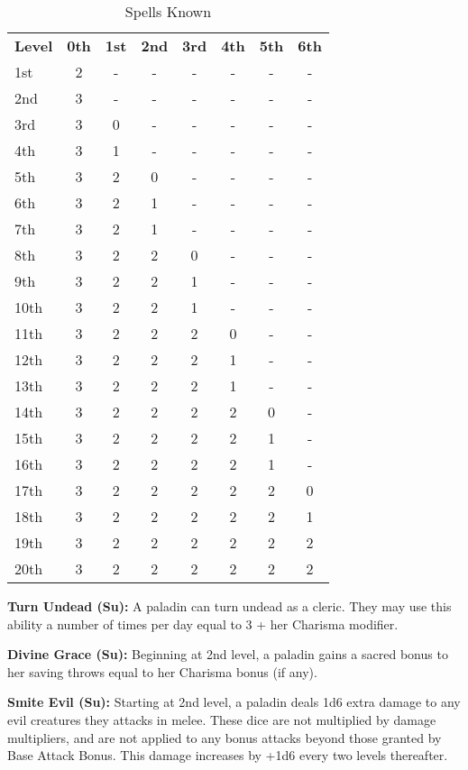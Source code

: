 \setlength{\intextsep}{-5pt}
\begin{wraptable}{O}{8.75cm}
\caption{\currentclassname{} Spells Known}
\begin{tabular}{l*{7}{c}}
\textbf{Level} & \textbf{0th} & \textbf{1st} & \textbf{2nd} & \textbf{3rd} & \textbf{4th} & \textbf{5th} & \textbf{6th} \\
1st & 2 & - & - & - & - & - & -\\
2nd & 3 & - & - & - & - & - & -\\
3rd & 3 & 0 & - & - & - & - & -\\
4th & 3 & 1 & - & - & - & - & -\\
5th & 3 & 2 & 0 & - & - & - & -\\
6th & 3 & 2 & 1 & - & - & - & -\\
7th & 3 & 2 & 1 & - & - & - & -\\
8th & 3 & 2 & 2 & 0 & - & - & -\\
9th & 3 & 2 & 2 & 1 & - & - & -\\
10th & 3 & 2 & 2 & 1 & - & - & -\\
11th & 3 & 2 & 2 & 2 & 0 & - & -\\
12th & 3 & 2 & 2 & 2 & 1 & - & -\\
13th & 3 & 2 & 2 & 2 & 1 & - & -\\
14th & 3 & 2 & 2 & 2 & 2 & 0 & -\\
15th & 3 & 2 & 2 & 2 & 2 & 1 & -\\
16th & 3 & 2 & 2 & 2 & 2 & 1 & -\\
17th & 3 & 2 & 2 & 2 & 2 & 2 & 0\\
18th & 3 & 2 & 2 & 2 & 2 & 2 & 1\\
19th & 3 & 2 & 2 & 2 & 2 & 2 & 2\\
20th & 3 & 2 & 2 & 2 & 2 & 2 & 2\\
\end{tabular}
\end{wraptable}

\textbf{Turn Undead (Su):} A paladin can turn undead as a cleric. They may use this ability a number of times per day equal to 3 + her Charisma modifier.

\textbf{Divine Grace (Su):} Beginning at 2nd level, a paladin gains a sacred bonus to her saving throws equal to her Charisma bonus (if any).

\textbf{Smite Evil (Su):} Starting at 2nd level, a paladin deals 1d6 extra damage to any evil creatures they attacks in melee. These dice are not multiplied by damage multipliers, and are not applied to any bonus attacks beyond those granted by Base Attack Bonus. This damage increases by +1d6 every two levels thereafter.

